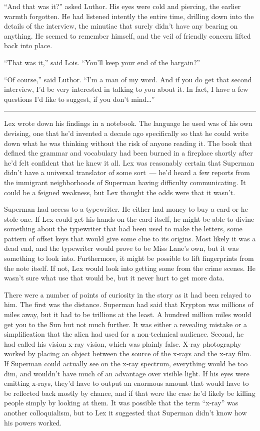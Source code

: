 \documentclass[ebook,12pt]{memoir}
\begin{document}
``And that was it?'' asked Luthor. His eyes were cold and piercing, the
earlier warmth forgotten. He had listened intently the entire time,
drilling down into the details of the interview, the minutiae that
surely didn't have any bearing on anything. He seemed to remember
himself, and the veil of friendly concern lifted back into place.

``That was it,'' said Lois. ``You'll keep your end of the bargain?''

``Of course,'' said Luthor. ``I'm a man of my word. And if you do get
that second interview, I'd be very interested in talking to you about
it. In fact, I have a few questions I'd like to suggest, if you don't
mind\ldots{}''

\begin{center}\rule{0.5\linewidth}{\linethickness}\end{center}

Lex wrote down his findings in a notebook. The language he used was of
his own devising, one that he'd invented a decade ago specifically so
that he could write down what he was thinking without the risk of anyone
reading it. The book that defined the grammar and vocabulary had been
burned in a fireplace shortly after he'd felt confident that he knew it
all. Lex was reasonably certain that Superman didn't have a universal
translator of some sort~--- he'd heard a few reports from the immigrant
neighborhoods of Superman having difficulty communicating. It could be a
feigned weakness, but Lex thought the odds were that it wasn't.

Superman had access to a typewriter. He either had money to buy a card
or he stole one. If Lex could get his hands on the card itself, he might
be able to divine something about the typewriter that had been used to
make the letters, some pattern of offset keys that would give some clue
to its origins. Most likely it was a dead end, and the typewriter would
prove to be Miss Lane's own, but it was something to look into.
Furthermore, it might be possible to lift fingerprints from the note
itself. If not, Lex would look into getting some from the crime scenes.
He wasn't sure what use that would be, but it never hurt to get more
data.

There were a number of points of curiosity in the story as it had been
relayed to him. The first was the distance. Superman had said that
Krypton was millions of miles away, but it had to be trillions at the
least. A hundred million miles would get you to the Sun but not much
further. It was either a revealing mistake or a simplification that the
alien had used for a non‐technical audience. Second, he had called his
vision x‐ray vision, which was plainly false. X‐ray photography worked
by placing an object between the source of the x‐rays and the x‐ray
film. If Superman could actually see on the x‐ray spectrum, everything
would be too dim, and wouldn't have much of an advantage over visible
light. If his eyes were emitting x‐rays, they'd have to output an
enormous amount that would have to be reflected back mostly by chance,
and if that were the case he'd likely be killing people simply by
looking at them. It was possible that the term ``x‐ray'' was another
colloquialism, but to Lex it suggested that Superman didn't know how his
powers worked.
\end{document}
